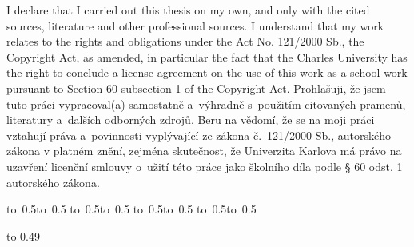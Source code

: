 \ifEN
\noindent
I declare that I carried out this \ThesisAccusative thesis on my own, and only with the cited sources, literature and other professional sources. I understand that my work relates to the rights and obligations under the Act No. 121/2000 Sb., the Copyright Act, as amended, in particular the fact that the Charles University has the right to conclude a license agreement on the use of this work as a school work pursuant to Section 60 subsection 1 of the Copyright Act.
\else
\noindent
Prohlašuji, že jsem tuto \ThesisAccusative práci vypracoval(a) samostatně a~výhradně s~použitím citovaných pramenů, literatury a~dalších odborných zdrojů. Beru na vědomí, že se na moji práci vztahují práva a~povinnosti vyplývající ze zákona č.~121/2000 Sb., autorského zákona v platném znění, zejména skutečnost, že Univerzita Karlova má právo na uzavření licenční smlouvy o~užití této práce jako školního díla podle § 60 odst. 1 autorského zákona.
\fi

\vspace{10mm}


\ifEN
\hbox{\hbox to 0.5\hbox to 0.5\hsize{\dotfill\quad}}
\smallskip
\hbox{\hbox to 0.5\hsize{}\hbox to 0.5}
\else
\hbox{\hbox to 0.5\hbox to 0.5\hsize{\dotfill\quad}}
\smallskip
\hbox{\hbox to 0.5\hsize{}\hbox to 0.5}
\fi

\vspace{20mm}
\newpage


\openright

\noindent
\Dedication

\newpage


\openright

\vbox to 0.49

